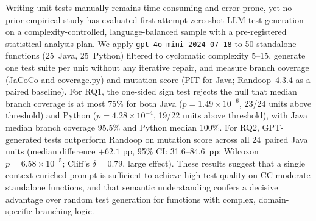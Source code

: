 Writing unit tests manually remains time-consuming and error-prone, yet no prior
empirical study has evaluated first-attempt zero-shot LLM test generation on a
complexity-controlled, language-balanced sample with a pre-registered statistical
analysis plan.
We apply \texttt{gpt-4o-mini-2024-07-18} to 50 standalone functions (25~Java,
25~Python) filtered to cyclomatic complexity 5--15, generate one test suite per
unit without any iterative repair, and measure branch coverage (JaCoCo and
coverage.py) and mutation score (PIT for Java; Randoop~4.3.4 as a paired baseline).
For RQ1, the one-sided sign test rejects the null that median branch coverage is
at most 75\% for both Java ($p = 1.49 \times 10^{-6}$, 23/24 units above
threshold) and Python ($p = 4.28 \times 10^{-4}$, 19/22 units above threshold),
with Java median branch coverage 95.5\% and Python median 100\%.
For RQ2, GPT-generated tests outperform Randoop on mutation score across all
24~paired Java units (median difference $+62.1$ pp, 95\% CI: 31.6--84.6~pp;
Wilcoxon $p = 6.58 \times 10^{-5}$; Cliff's $\delta = 0.79$, large effect).
These results suggest that a single context-enriched prompt is sufficient to
achieve high test quality on CC-moderate standalone functions, and that semantic
understanding confers a decisive advantage over random test generation for
functions with complex, domain-specific branching logic.
